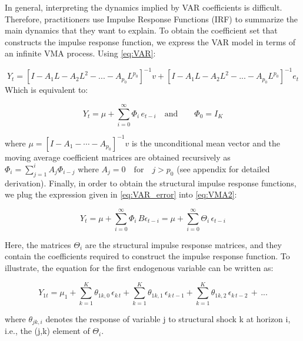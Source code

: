 \documentclass[12pt, a4paper]{article}
\begin{document}
In general, interpreting the dynamics implied by VAR coefficients is difficult. Therefore, practitioners use Impulse Response Functions (IRF) to summarize the main dynamics that they want to explain. To obtain the coefficient set that constructs the impulse response function, we express the VAR model in terms of an infinite VMA process. Using \eqref{eq:VAR}:

\begin{equation} \label{eq:VMA}
    Y_t = [I-A_1L-A_2L^2-...-A_{p_0}L^{p_0}]^{-1}v + [I-A_1L-A_2L^2-...-A_{p_0}L^{p_0}]^{-1}e_t
\end{equation}
Which is equivalent to: 

\begin{equation} \label{eq:VMA2}
    Y_t = \mu + \sum_{i=0}^{\infty} \Phi_i\,e_{t-i} \quad \text{and} \qquad \Phi_0 = I_K
\end{equation}

where $\mu = [I - A_1 - \cdots - A_{p_0}]^{-1}v$ is the unconditional mean vector and the moving average coefficient matrices are obtained recursively as $\Phi_i = \sum_{j=1}^{i} A_j\Phi_{i-j}$ where $A_j = 0 \quad \text{for} \quad j>p_0$ (see appendix for detailed derivation). Finally, in order to obtain the structural impulse response functions, we plug the expression given in \eqref{eq:VAR_error} into \eqref{eq:VMA2}:

\begin{equation} \label{eq:SVAR}
    Y_t = \mu + \sum_{i=0}^{\infty} \Phi_i\,B\epsilon_{t-i} = \mu + \sum_{i=0}^{\infty} \Theta_i\,\epsilon_{t-i}
\end{equation}

Here, the matrices $\Theta_i$ are the structural impulse response matrices, and they contain the coefficients required to construct the impulse response function. To illustrate, the equation for the first endogenous variable can be written as: 

\begin{equation} \label{eq:SVAR2}
    Y_{1t} = \mu_1 + \sum_{k=1}^{K} \theta_{1k,0} \, \epsilon_{k\,t} + \sum_{k=1}^{K} \theta_{1k,1} \, \epsilon_{k\,t-1} + \sum_{k=1}^{K} \theta_{1k,2} \, \epsilon_{k\,t-2} \, + \, ...
\end{equation} 

where $\theta_{jk,i}$ denotes the response of variable j to structural shock k at horizon i, i.e., the (j,k) element of $\Theta_i$. 
\end{document}
